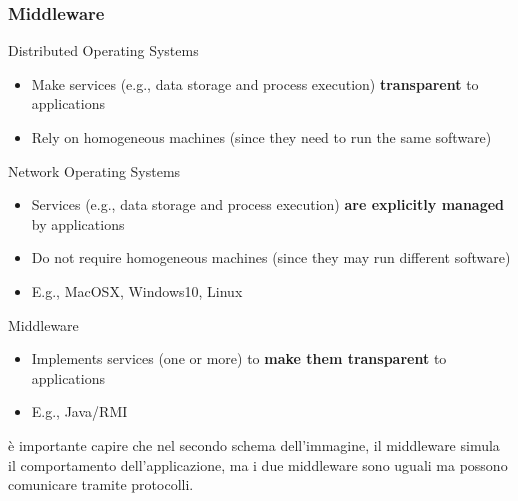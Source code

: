 \subsubsection{Middleware}
Distributed Operating Systems
\begin{itemize}
    \item Make services (e.g., data storage and process execution) \textbf{transparent} to applications
    \item Rely on homogeneous machines (since they need to run the same software)
\end{itemize}
Network Operating Systems
\begin{itemize}
    \item Services (e.g., data storage and process execution) \textbf{are explicitly managed} by applications
    \item Do not require homogeneous machines (since they may run different software)
    \item E.g., MacOSX, Windows10, Linux
\end{itemize}
Middleware
\begin{itemize}
    \item Implements services (one or more) to \textbf{make them transparent} to applications
    \item E.g., Java/RMI
\end{itemize}
è importante capire che nel secondo schema dell'immagine, il middleware simula il comportamento dell'applicazione, ma i due middleware sono uguali ma possono comunicare tramite protocolli.

